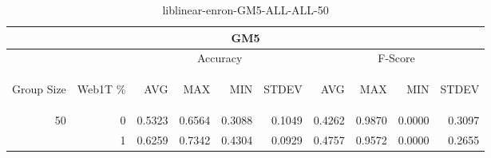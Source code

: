 \begin{center}
\begin{table}[htbp]
\begin{tabular}{ | r | r | r | r | r | r | r | r | r | r |}
\hline
\multicolumn{10}{|c|}{GM5}\\
\hline
 & & \multicolumn{4}{|c|}{Accuracy} & \multicolumn{4}{|c|}{F-Score}\\ \cline{3-10}
\begin{sideways}Group Size\end{sideways} & \begin{sideways}Web1T \%\end{sideways} & \begin{sideways}AVG\end{sideways} & \begin{sideways}MAX\end{sideways} & \begin{sideways}MIN\end{sideways} & \begin{sideways}STDEV\end{sideways} & \begin{sideways}AVG\end{sideways} & \begin{sideways}MAX\end{sideways} & \begin{sideways}MIN\end{sideways} & \begin{sideways}STDEV\end{sideways}\\
\hline
\multirow{1}{*}{50}
 & 0 & 0.5323 & 0.6564 & 0.3088 & 0.1049 & 0.4262 & 0.9870 & 0.0000 & 0.3097\\ \cline{2-10}
 & 1 & 0.6259 & 0.7342 & 0.4304 & 0.0929 & 0.4757 & 0.9572 & 0.0000 & 0.2655\\ \cline{2-10}
\hline
\end{tabular}
\caption{liblinear-enron-GM5-ALL-ALL-50}
\label{table:liblinear-enron-GM5-ALL-ALL-50}
\end{table}
\end{center}

